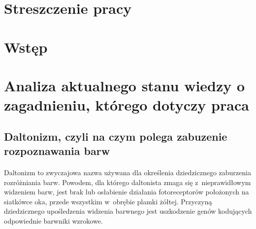 \documentclass[12pt, letterpaper]{article}
\begin{document}
\setlength{\parindent}{1cm}
\newpage


\section{Streszczenie pracy}

\tableofcontents

\newpage

\section{Wstęp}


\newpage
\section{Analiza aktualnego stanu wiedzy o zagadnieniu, którego dotyczy praca}

\subsection{Daltonizm, czyli na czym polega zabuzenie rozpoznawania barw}

\paragraph{}
Daltonizm to zwyczajowa nazwa używana dla określenia dziedzicznego zaburzenia rozróżniania barw. Powodem, dla którego daltonista zmaga się z~nieprawidłowym widzeniem barw, jest brak lub osłabienie działania fotoreceptorów położonych na siatkówce oka, przede wszystkim w~obrębie plamki żółtej. Przyczyną dziedzicznego upośledzenia widzenia barwnego jest uszkodzenie genów kodujących odpowiednie barwniki wzrokowe.
\end{document}

